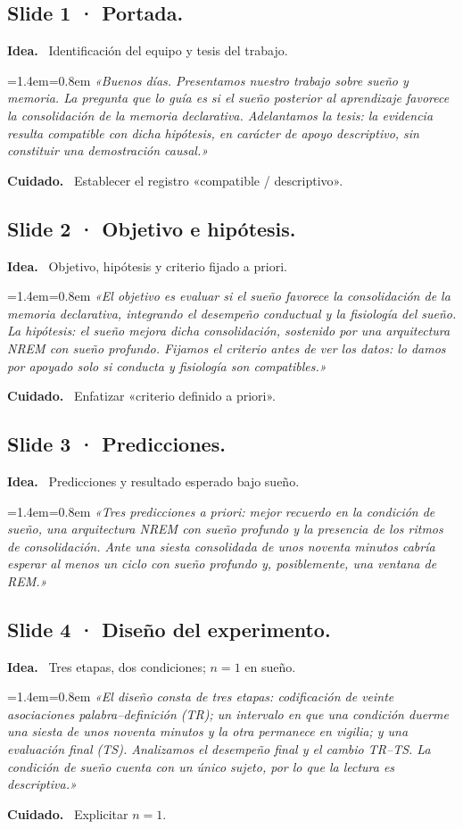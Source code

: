 \documentclass[11pt,a4paper]{article}
\newenvironment{guion}%
{\par\smallskip\begingroup\leftskip=1.4em\rightskip=0.8em\color{ink}\itshape}%
{\par\endgroup\smallskip}
\newcommand{\lab}[1]{\textbf{\color{ink}#1}\ }
\begin{document}
\subsection{Slide 1 · Portada.}
\lab{Idea.} Identificación del equipo y tesis del trabajo.
\begin{guion}
«Buenos días. Presentamos nuestro trabajo sobre sueño y memoria. La pregunta que lo guía es si el
sueño posterior al aprendizaje favorece la consolidación de la memoria declarativa. Adelantamos la
tesis: la evidencia resulta \emph{compatible} con dicha hipótesis, en carácter de apoyo descriptivo,
sin constituir una demostración causal.»
\end{guion}
\lab{Cuidado.} Establecer el registro «compatible / descriptivo».

\subsection{Slide 2 · Objetivo e hipótesis.}
\lab{Idea.} Objetivo, hipótesis y criterio fijado a priori.
\begin{guion}
«El objetivo es evaluar si el sueño favorece la consolidación de la memoria declarativa, integrando
el desempeño conductual y la fisiología del sueño. La hipótesis: el sueño mejora dicha consolidación,
sostenido por una arquitectura NREM con sueño profundo. Fijamos el criterio antes de ver los datos:
lo damos por apoyado solo si conducta y fisiología son compatibles.»
\end{guion}
\lab{Cuidado.} Enfatizar «criterio definido a priori».

\subsection{Slide 3 · Predicciones.}
\lab{Idea.} Predicciones y resultado esperado bajo sueño.
\begin{guion}
«Tres predicciones a priori: mejor recuerdo en la condición de sueño, una arquitectura NREM con sueño
profundo y la presencia de los ritmos de consolidación. Ante una siesta consolidada de unos noventa
minutos cabría esperar al menos un ciclo con sueño profundo y, posiblemente, una ventana de REM.»
\end{guion}

\subsection{Slide 4 · Diseño del experimento.}
\lab{Idea.} Tres etapas, dos condiciones; $n=1$ en sueño.
\begin{guion}
«El diseño consta de tres etapas: codificación de veinte asociaciones palabra--definición (TR); un
intervalo en que una condición duerme una siesta de unos noventa minutos y la otra permanece en
vigilia; y una evaluación final (TS). Analizamos el desempeño final y el cambio TR--TS. La condición de
sueño cuenta con un único sujeto, por lo que la lectura es descriptiva.»
\end{guion}
\lab{Cuidado.} Explicitar $n=1$.
\end{document}
